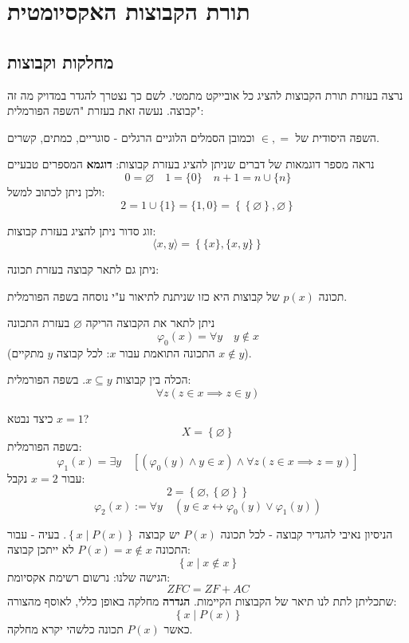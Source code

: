 \documentclass{tstextbook}
\begin{document}
\chapter{תורת הקבוצות האקסיומטית}

\section{מחלקות וקבוצות}

נרצה בעזרת תורת הקבוצות להציג כל אובייקט מתמטי. לשם כך נצטרך להגדר במדויק מה זה קבוצה. נעשה זאת בעזרת "השפה הפורמלית":

\begin{definition}
השפה היסודית של \(\in, =\) וכמובן הסמלים הלוגיים הרגלים - סוגריים, כמתים, קשרים.

\end{definition}
נראה מספר דוגמאות של דברים שניתן להציג בעזרת קבוצות:
\textbf{דוגמא}
המספרים טבעיים
$$0 = \varnothing \quad 1 = \{ 0 \}\quad n+1=n\cup \{ n \}$$
ולכן ניתן לכתוב למשל:
$$2=1 \cup \{ 1 \} = \{ 1,0 \}=\left\{  \left\{  \varnothing   \right\},\varnothing   
\right\}$$

\begin{example}
זוג סדור ניתן להציג בעזרת קבוצות:
$$\langle x,y \rangle =\left\{  \{ x \},\{ x,y \}  \right\}$$

\end{example}
ניתן גם לתאר קבוצה בעזרת תכונה:

\begin{definition}
תכונה \(p(x)\) של קבוצות היא כזו שניתנת לתיאור ע"י נוסחה בשפה הפורמלית.

\end{definition}
\begin{example}
ניתן לתאר את הקבוצה הריקה \(\varnothing\) בעזרת התכונה
$$\varphi_{0}(x)= \forall y\quad y \not \in x$$
(התכונה התואמת עבור \(x\): לכל קבוצה \(y\) מתקיים \(x\not \in y\)).

\end{example}
\begin{example}
הכלה בין קבוצות \(x\subseteq y\). בשפה הפורמלית:
$$\forall z\left( z \in x \implies z \in y \right)$$

\end{example}
\begin{example}
כיצד נבטא \(x=1\)?
$$X=\left\{  \varnothing   \right\}$$
בשפה הפורמלית:
$$\varphi_{1}(x)= \exists y\quad \left[ \left( \varphi_{0}(y)\land y \in x \right) \land  \forall z \left( z \in x\implies z = y \right)\right]$$
עבור \(x=2\) נקבל:
$$2=\left\{  \varnothing ,\left\{  \varnothing   \right\}  \right\}$$$$\varphi_{2}\left(x\right):=\forall y\quad\left(y\in x\leftrightarrow\varphi_{0}\left(y\right)\vee\varphi_{1}\left(y\right)\right)$$

\end{example}
הניסיון נאיבי להגדיר קבוצה - לכל תכונה \(P(x)\) יש קבוצה \(\left\{  x \mid P(x)  \right\}\).
בעיה - עבור התכונה \(P(x)=x \not \in x\) לא ייתכן קבוצה:
$$\left\{  x\mid x \not  \in x  \right\}$$
הגישה שלנו: נרשום רשימת אקסיומת:
$$ZFC = ZF+AC$$
שתכליתן לתת לנו תיאר של הקבוצות הקיימות.
\textbf{הגדרה} מחלקה
באופן כללי, לאוסף מהצורה:
$$\left\{  x\mid P(x)  \right\}$$
כאשר \(P(x)\) תכונה כלשהי יקרא מחלקה.
\end{document}
